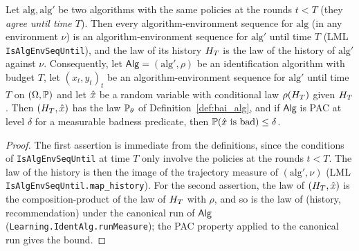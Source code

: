 \begin{lemma}\label{lem:prefix_transfer}
\leanok
{}
Let $\mathrm{alg}, \mathrm{alg}'$ be two algorithms with the same policies at the rounds
$t < T$ (they \emph{agree until time $T$}). Then every
algorithm-environment sequence for $\mathrm{alg}$ (in any environment $\nu$) is an
algorithm-environment sequence for $\mathrm{alg}'$ until time $T$ (LML
\texttt{IsAlgEnvSeqUntil}), and the law of its history $H_{T}$ is the law of the history
of $\mathrm{alg}'$ against $\nu$. Consequently, let $\mathsf{Alg} = (\mathrm{alg}', \rho)$ be an
identification algorithm with budget $T$, let $(x_t, y_t)_t$ be an algorithm-environment
sequence for $\mathrm{alg}'$ until time $T$ on $(\Omega, \mathbb{P})$ and let $\hat{x}$ be a random
variable with conditional law $\rho(H_{T})$ given $H_{T}$. Then
$(H_{T}, \hat{x})$ has the law $\mathbb{P}_\theta$ of Definition~\ref{def:bai_alg}, and if
$\mathsf{Alg}$ is PAC at level $\delta$ for a measurable badness predicate, then
$\mathbb{P}(\hat{x} \text{ is bad}) \le \delta$.
\end{lemma}

\begin{proof}
\leanok
{}
The first assertion is immediate from the definitions, since the conditions of
\texttt{IsAlgEnvSeqUntil} at time $T$ only involve the policies at the rounds $t < T$. The law of
the history is then the image of the trajectory measure of $(\mathrm{alg}', \nu)$ (LML
\texttt{IsAlgEnvSeqUntil.map\_history}). For the second
assertion, the law of $(H_{T}, \hat{x})$ is the composition-product of the law of
$H_{T}$ with $\rho$, and so is the law of (history, recommendation) under the canonical
run of $\mathsf{Alg}$ (\texttt{Learning.IdentAlg.runMeasure}); the PAC property
applied to the canonical run gives the bound.
\end{proof}

